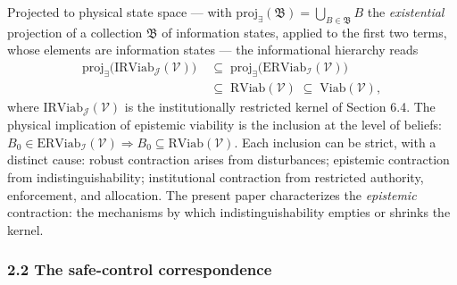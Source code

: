 \documentclass[10pt,twocolumn]{article}
\theoremstyle{definition}
\begin{document}
Projected to physical state space --- with
\(\mathrm{proj}_{\exists}(\mathfrak{B}) = \bigcup_{B \in \mathfrak{B}} B\)
the \emph{existential} projection of a collection \(\mathfrak{B}\) of
information states, applied to the first two terms, whose elements are information states --- the informational hierarchy
reads
\[
\begin{aligned}
\mathrm{proj}_{\exists}\big(\mathrm{IRViab}_{\mathcal{J}}(\mathcal{V})\big)&\;\subseteq\; \mathrm{proj}_{\exists}\big(\mathrm{ERViab}_{\mathcal{I}}(\mathcal{V})\big) \\
&\;\subseteq\; \mathrm{RViab}(\mathcal{V}) \;\subseteq\; \mathrm{Viab}(\mathcal{V}),
\end{aligned}
\]
where \(\mathrm{IRViab}_{\mathcal{J}}(\mathcal{V})\) is the institutionally restricted kernel of Section 6.4. The physical implication of epistemic viability is the
inclusion at the level of beliefs:
\(B_0 \in \mathrm{ERViab}_{\mathcal{I}}(\mathcal{V}) \Rightarrow B_0 \subseteq \mathrm{RViab}(\mathcal{V})\).
Each inclusion can be strict, with a distinct cause: robust contraction
arises from disturbances; epistemic contraction from
indistinguishability; institutional contraction from restricted
authority, enforcement, and allocation. The present paper characterizes
the \emph{epistemic} contraction: the mechanisms by which
indistinguishability empties or shrinks the kernel.

\subsubsection{2.2 The safe-control
correspondence}\label{the-safe-control-correspondence}
\end{document}
